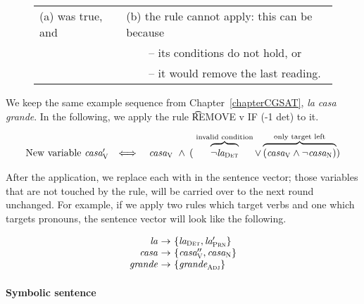 \begin{figure}[h]
\begin{tabular}{l l}
(a) \oldVar{} was true, and 
                             & (b) the rule cannot apply: this can be because \\
                                     & ~~~~-- its conditions do not hold, or \\
                                     & ~~~~-- it would remove the last reading.
\end{tabular}
\end{figure}

\noindent We keep the same example sequence from Chapter~\ref{chapterCGSAT}, {\em la casa grande}. In the following, we apply the rule \t{REMOVE v IF (-1 det)} to it.

$$\begin{array}{r l}
\text{New variable } \casa{}'_\v 
      & \Longleftrightarrow \quad \casaV\ 
        \wedge\: ( \; \ob{\neg\laDet}^{\invConds} 
        \vee  \ob{(\casaV \wedge \neg \casaN) }^{\onlyTrgLeft} ) \\
\end{array}$$


\noindent After the application, we replace each \oldVar with \newVar in the sentence vector; those variables that are not touched by the rule, will be carried over to the next round unchanged. 
For example, if we apply two rules which target verbs and one which targets pronouns, 
the sentence vector will look like the following. 


$$\begin{array}{r @{~\rightarrow~} l}
\emph{la} & \{\laDet, \la{}'_\prn \} \\
\emph{casa} & \{\casa{}''_\v, \casaN \} \\
\emph{grande} & \{ \grandeAdj \} \\
\end{array}$$


\paragraph{Symbolic sentence}

